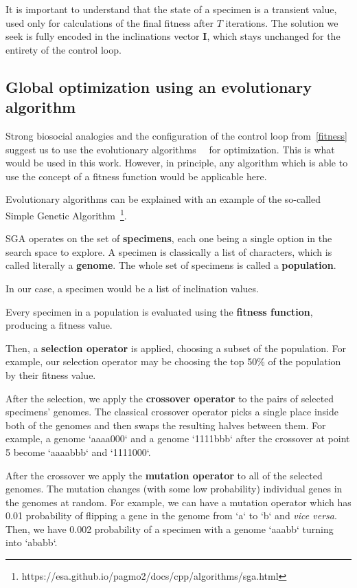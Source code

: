 \documentclass[12pt, a4paper]{article}
\begin{document}
  It is important to understand that the state of a specimen is a transient value, used only for calculations of the final fitness after $T$ iterations.
  The solution we seek is fully encoded in the inclinations vector $\mathbf{I}$, which stays unchanged for the entirety of the control loop.

	\subsection{Global optimization using an evolutionary algorithm}\label{section::evolutionary}

	Strong biosocial analogies and the configuration of the control loop from~\ref{fitness} suggest us to use the evolutionary algorithms~\cite{song2023rl_ea}~\cite{beyer2002evolution_strategies} for optimization.
	This is what would be used in this work.
	However, in principle, any algorithm which is able to use the concept of a fitness function would be applicable here.

  Evolutionary algorithms can be explained with an example of the so-called Simple Genetic Algorithm~\footnote{https://esa.github.io/pagmo2/docs/cpp/algorithms/sga.html}.

  SGA operates on the set of \textbf{specimens}, each one being a single option in the search space to explore.
  A specimen is classically a list of characters, which is called literally a \textbf{genome}.
  The whole set of specimens is called a \textbf{population}.

  In our case, a specimen would be a list of inclination values.

  Every specimen in a population is evaluated using the \textbf{fitness function}, producing a fitness value.

  Then, a \textbf{selection operator} is applied, choosing a subset of the population.
  For example, our selection operator may be choosing the top 50\% of the population by their fitness value.

  After the selection, we apply the \textbf{crossover operator} to the pairs of selected specimens' genomes.
  The classical crossover operator picks a single place inside both of the genomes and then swaps the resulting halves between them.
  For example, a genome `aaaa000` and a genome `1111bbb` after the crossover at point 5 become `aaaabbb` and `1111000`.

  After the crossover we apply the \textbf{mutation operator} to all of the selected genomes.
  The mutation changes (with some low probability) individual genes in the genomes at random.
  For example, we can have a mutation operator which has 0.01 probability of flipping a gene in the genome from `a` to `b` and \textit{vice versa}.
  Then, we have 0.002 probability of a specimen with a genome `aaabb` turning into `ababb`.
\end{document}
